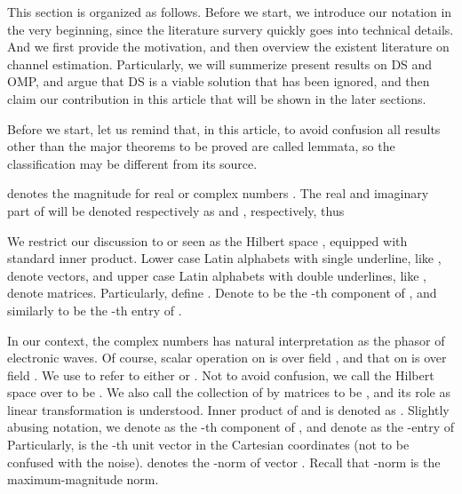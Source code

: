 \startchapter [title={Introduction}]


This section is organized as follows.
Before we start, we introduce our notation in the very beginning, since the literature survery quickly goes into technical details.
And we first provide the motivation, and then overview the existent literature on channel estimation.
Particularly, we will summerize present results on DS and OMP, and argue that DS is a viable solution that has been ignored, and then claim our contribution in this article that will be shown in the later sections.

\startsection [title={Notation}]

Before we start, let us remind that, in this article, to avoid confusion all results other than the major theorems to be proved are called lemmata, so the classification may be different from its source.

 denotes the magnitude for real or complex numbers .
The real and imaginary part of  will be denoted respectively as  and , respectively, thus 

We restrict our discussion to  or  seen as the Hilbert space , equipped with standard inner product.
Lower case Latin alphabets with single underline, like , denote vectors, and upper case Latin alphabets with double underlines, like , denote matrices.
Particularly, define .
Denote  to be the -th component of , and similarly  to be the -th entry of .

In our context, the complex numbers has natural interpretation as the phasor of electronic waves.
Of course, scalar operation on  is over field , and that on  is over field .
We use  to refer to either  or .
Not to avoid confusion, we call the Hilbert space  over  to be .
We also call the collection of  by  matrices to be , and its role as linear transformation is understood.
Inner product of  and  is denoted as .
Slightly abusing notation, we denote as  the -th component of , and denote as  the -entry of 
Particularly,  is the -th unit vector in the Cartesian coordinates (not to be confused with the noise).
 denotes the -norm of vector .
Recall that \m {\ell_\infty}-norm is the maximum-magnitude norm.

